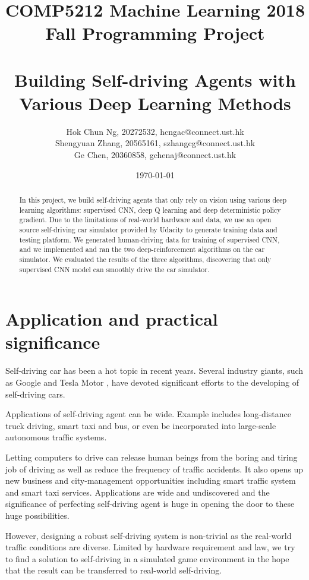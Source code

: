 \documentclass[a4paper]{article}
\title{COMP5212 Machine Learning 2018 Fall Programming Project \\
       \ \ \ \ \\
       Building Self-driving Agents with Various Deep Learning Methods}
\author{Hok Chun Ng, 20272532, hcngac@connect.ust.hk \\
        Shengyuan Zhang, 20565161, szhangcg@connect.ust.hk \\
        Ge Chen, 20360858, gchenaj@connect.ust.hk}
\date{\today}
\begin{document}
\maketitle

\begin{abstract}
In this project, we build self-driving agents that only rely on vision using various deep learning algorithms: supervised CNN, deep Q learning\cite{mnih2015human} and deep deterministic policy gradient\cite{silver2014deterministic}. Due to the limitations of real-world hardware and data, we use an open source self-driving car simulator provided by Udacity \cite{selfdrivingsimulator} to generate training data and testing platform. We generated human-driving data for training of supervised CNN, and we implemented and ran the two deep-reinforcement algorithms on the car simulator. We evaluated the results of the three algorithms, discovering that only supervised CNN model can smoothly drive the car simulator.
\end{abstract}

\section{Application and practical significance}

Self-driving car has been a hot topic in recent years. Several industry giants, such as Google
\cite{waymo} and Tesla Motor \cite{tesla}, have devoted significant efforts to the developing of
self-driving cars. 

Applications of self-driving agent can be wide. Example includes long-distance truck driving,
smart taxi and bus, or even be incorporated into large-scale autonomous traffic systems.

Letting computers to drive can release human beings from the boring and tiring job of driving as
well as reduce the frequency of traffic accidents. It also opens up new business and
city-management opportunities including smart traffic system and smart taxi services.
Applications are wide and undiscovered and the significance of perfecting self-driving agent is
huge in opening the door to these huge possibilities.

However, designing a robust self-driving system is non-trivial as the real-world traffic
conditions are diverse. Limited by hardware requirement and law, we try to find a solution to
self-driving in a simulated game environment in the hope that the result can be transferred to
real-world self-driving.
\end{document}
